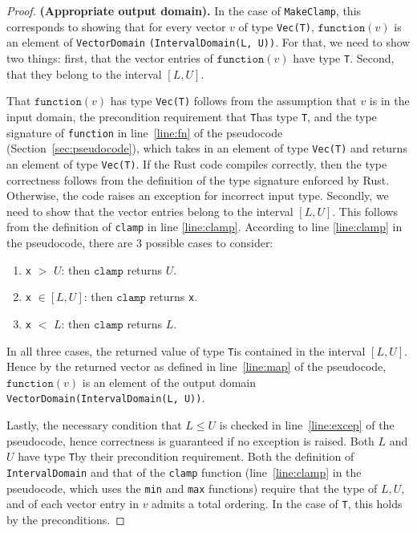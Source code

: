 \documentclass[11pt,a4paper]{article}
\theoremstyle{definition}
\newcommand{\T}{\texttt{T}}
\newcommand{\clamp}{\texttt{clamp}}
\newcommand{\function}{\texttt{function}}
\newcommand{\mike}[1]{{ {\color{green}{(mike)~#1}}}}
\begin{document}
\begin{proof}
\textbf{(Appropriate output domain).} In the case of \texttt{MakeClamp}, this corresponds to showing that for every vector $v$ of type \texttt{Vec(T)}, $\function(v)$ is an element of \texttt{VectorDomain} \texttt{(IntervalDomain(L, U))}. For that, we need to show two things: first, that the vector entries of $\function(v)$ have type \T. %
Second, that they belong to the interval $[L, U]$.

That $\function(v)$ has type \texttt{Vec(T)}  follows from the assumption that $v$ is in the input domain, the precondition requirement that \T has type \T, and the type signature of \texttt{function} in line~\ref{line:fn} of the pseudocode (Section~\ref{sec:pseudocode}), which takes in an element of type \texttt{Vec(T)} and returns an element of type \texttt{Vec(T)}. If the Rust code compiles correctly, then the type correctness follows from the definition of the type signature enforced by Rust. Otherwise, the code raises an exception for incorrect input type. Secondly, we need to show that the vector entries belong to the interval $[L, U]$. This follows from the definition of \texttt{clamp} in line \ref{line:clamp}. According to line \ref{line:clamp} in the pseudocode, there are 3 possible cases to consider:
\begin{enumerate}
    \item \texttt{x} $>$ $U$: then $\clamp$ returns $U$.
    \item \texttt{x} $\in [L, U]$: then $\clamp$ returns \texttt{x}.
    \item \texttt{x} $<$ $L$: then $\clamp$ returns $L$.
\end{enumerate}
In all three cases, the returned value of type \T is contained in the interval $[L, U]$. Hence by the returned vector as defined in line~\ref{line:map} of the pseudocode, $\function(v)$ is an element of the output domain \texttt{VectorDomain(IntervalDomain(L, U))}.

Lastly, the necessary condition that $L \leq U$ is checked in line~\ref{line:excep} of the pseudocode, hence correctness is guaranteed if no exception is raised. Both $L$ and $U$ have type \T by their precondition requirement. Both the definition of \texttt{IntervalDomain} and that of the \texttt{clamp} function (line~\ref{line:clamp} in the pseudocode, which uses the \texttt{min} and \texttt{max} functions) require that the type of $L, U$, and of each vector entry in $v$ admits a total ordering. In the case of \T, this holds by the preconditions.
\mike{floats don't have a total ordering. It only holds for non-null floats!}


\end{proof}
\end{document}
